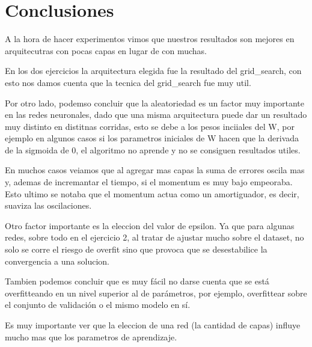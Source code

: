 \section{Conclusiones}
A la hora de hacer experimentos vimos que nuestros resultados son mejores en arquitecutras con pocas capas en lugar de con muchas.

En los dos ejercicios la arquitectura elegida fue la resultado del grid\_search, con esto nos damos cuenta que la tecnica del grid\_search fue muy util.

Por otro lado, podemso concluir que la aleatoriedad es un factor muy importante en las redes neuronales, dado que una misma arquitectura puede dar un resultado muy distinto en distitnas corridas, esto se debe a los pesos inciiales del W, por ejemplo en algunos casos si los parametros iniciales de W hacen que la derivada de la sigmoida de 0, el algoritmo no aprende y no se consiguen resultados utiles.

En muchos casos veiamos que al agregar mas capas la suma de errores oscila mas y, ademas de incremantar el tiempo, si el momentum es muy bajo empeoraba. Esto ultimo se notaba que el momentum actua como un amortiguador, es decir, suaviza las oscilaciones.

Otro factor importante es la eleccion del valor de epsilon. Ya que para algunas redes, sobre todo en el ejercicio 2, al tratar de ajustar mucho sobre el dataset, no solo se corre el riesgo de overfit sino que provoca que se desestabilice la convergencia a una solucion.

Tambien podemos concluir que es muy fácil no darse cuenta que se está overfitteando en un nivel superior al de parámetros, por ejemplo, overfittear sobre el conjunto de validación o el mismo modelo en sí.

Es muy importante ver que la eleccion de una red (la cantidad de capas) influye mucho mas que los parametros de aprendizaje.

